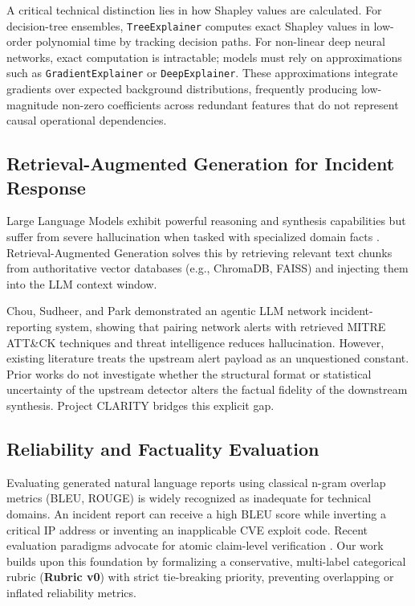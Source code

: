 \documentclass[conference]{IEEEtran}
\begin{document}
A critical technical distinction lies in how Shapley values are calculated. For decision-tree ensembles, \texttt{TreeExplainer} computes exact Shapley values in low-order polynomial time by tracking decision paths. For non-linear deep neural networks, exact computation is intractable; models must rely on approximations such as \texttt{GradientExplainer} or \texttt{DeepExplainer}. These approximations integrate gradients over expected background distributions, frequently producing low-magnitude non-zero coefficients across redundant features that do not represent causal operational dependencies.

\subsection{Retrieval-Augmented Generation for Incident Response}
Large Language Models exhibit powerful reasoning and synthesis capabilities but suffer from severe hallucination when tasked with specialized domain facts \cite{lewis2020retrieval}. Retrieval-Augmented Generation solves this by retrieving relevant text chunks from authoritative vector databases (e.g., ChromaDB, FAISS) and injecting them into the LLM context window. 

Chou, Sudheer, and Park \cite{chou2026llm} demonstrated an agentic LLM network incident-reporting system, showing that pairing network alerts with retrieved MITRE ATT\&CK techniques and threat intelligence reduces hallucination. However, existing literature treats the upstream alert payload as an unquestioned constant. Prior works do not investigate whether the structural format or statistical uncertainty of the upstream detector alters the factual fidelity of the downstream synthesis. Project CLARITY bridges this explicit gap.

\subsection{Reliability and Factuality Evaluation}
Evaluating generated natural language reports using classical n-gram overlap metrics (BLEU, ROUGE) is widely recognized as inadequate for technical domains. An incident report can receive a high BLEU score while inverting a critical IP address or inventing an inapplicable CVE exploit code. Recent evaluation paradigms advocate for atomic claim-level verification \cite{chou2026llm}. Our work builds upon this foundation by formalizing a conservative, multi-label categorical rubric (\textbf{Rubric v0}) with strict tie-breaking priority, preventing overlapping or inflated reliability metrics.
\end{document}
